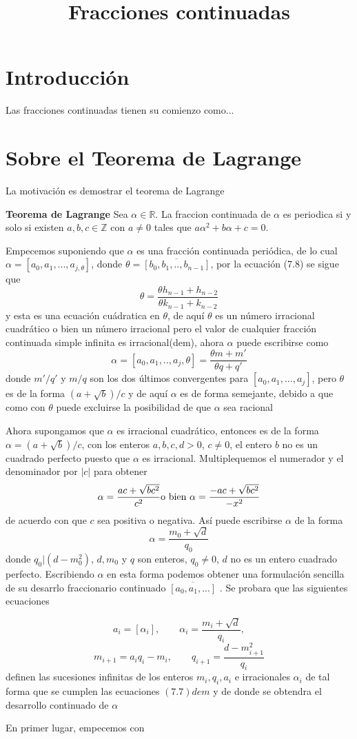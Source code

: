 \documentclass[11pt, article]{article}
\title{Fracciones continuadas}
\author{}
\date{}
\begin{document}
\maketitle
\thispagestyle{empty}
\section*{Introducción}
    Las fracciones continuadas tienen su comienzo como...
\section*{Sobre el Teorema de Lagrange}
    La motivación es demostrar el teorema de Lagrange

    \textbf{Teorema de Lagrange} Sea $\alpha \in \mathbb{R}$. La fraccion continuada de $\alpha$ es periodica si y solo si existen $a, b, c \in\mathbb{Z}$ con $a\not=0$ tales que $a\alpha^2 + b\alpha + c = 0$.

    Empecemos suponiendo que $\alpha$ es una fracción continuada periódica, de lo cual $\alpha= [a_0,a_1,...,a_{j,\theta}]$, donde $\theta=\overline{[b_0,b_1,..,b_{n-1}]}$, por la ecuación (7.8) se sigue que
        \[
        \theta =\dfrac{\theta h_{n-1}+h_{n-2}}{\theta k_{n-1}+k_{n-2}}
        \]
    y esta es una ecuación cuádratica en $\theta$, de aquí $\theta$ es un número irracional cuadrático o bien un número irracional pero el valor de cualquier fracción continuada simple infinita es irracional(dem), ahora $\alpha$ puede escribirse como 
        \[
        \alpha = [a_0,a_1,..,a_j,\theta]=\dfrac{\theta m + m'}{\theta q + q'}
        \]
    donde $m'/q'$ y $m/q$ son los dos últimos convergentes para $[a_0,a_1,...,a_j]$, pero $\theta$ es de la forma $(a + \sqrt{b})/c$ y de aquí $\alpha$ es de forma semejante, debido a que como con $\theta$ puede excluirse la posibilidad de que $\alpha$ sea racional

    Ahora supongamos que $\alpha$ es irracional cuadrático, entonces es de la forma $\alpha=(a+\sqrt{b})/c$, con los enteros $a,b,c,d>0$, $c\not=0$, el entero $b$ no es un cuadrado perfecto puesto que $\alpha$ es irracional. Multiplequemos el numerador y el denominador por $|c|$ para obtener 
        \[
        \alpha = \dfrac{ac + \sqrt{bc^2}}{c^2} \textnormal{o bien } \alpha=\dfrac{-ac+\sqrt{bc^2}}{-x^2}
        \]
    de acuerdo con que $c$ sea positiva o negativa. Así puede escribirse $\alpha$ de la forma
        \[
        \alpha = \dfrac{m_0+\sqrt{d}}{q_0}
        \]
    donde $q_0|(d-m_0^2)$, $d,m_0$ y $q$ son enteros, $q_0\not=0$, $d$ no es un entero cuadrado perfecto. Escribiendo $\alpha$ en esta forma podemos obtener una formulación sencilla de su desarrlo fraccionario continuado $\overline{[a_0,a_1,...]}$ . Se probara que las siguientes ecuaciones 

        \[
        a_i=[\alpha_i], \qquad \alpha_i=\dfrac{m_i+\sqrt{d}}{q_i},
        \]
        \[
        m_{i+1}=a_iq_i-m_i, \qquad q_{i+1}=\dfrac{d-m_{i+1}^2}{q_i}
        \]
    definen las sucesiones infinitas de los enteros $m_i,q_i,a_i$ e irracionales $\alpha_i$ de tal forma que se cumplen las ecuaciones $(7.7)dem$ y de donde se obtendra el desarrollo continuado de $\alpha$

    En primer lugar, empecemos con 
\end{document}
